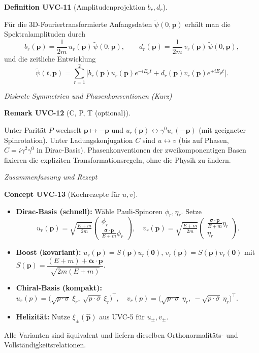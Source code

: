 \documentclass[10pt, letterpaper]{article}
\newcommand{\CustomHeading}[3]{%
  \par\medskip\noindent%
  \textbf{#1 #2} \textnormal{(#3)}.\enskip%
}
\newenvironment{DEF}[2]{\begin{unitbox}\CustomHeading{Definition}{#1}{#2}}{\end{unitbox}}
\newenvironment{REM}[2]{\begin{unitbox}\CustomHeading{Remark}{#1}{#2}}{\end{unitbox}}
\newenvironment{CONC}[2]{\begin{unitbox}\CustomHeading{Concept}{#1}{#2}}{\end{unitbox}}
\begin{document}
\begin{DEF}{UVC-11}{Amplitudenprojektion $b_r,d_r$}
Für die 3D-Fouriertransformierte Anfangsdaten $\tilde\psi(0,\mathbf p)$ erhält man die Spektralamplituden durch
\[
b_r(\mathbf p)=\frac{1}{2m}\,\bar u_r(\mathbf p)\,\tilde\psi(0,\mathbf p),\qquad
d_r(\mathbf p)=\frac{1}{2m}\,\bar v_r(\mathbf p)\,\tilde\psi(0,\mathbf p),
\]
und die zeitliche Entwicklung
\[
\tilde\psi(t,\mathbf p)=\sum_{r=1}^2\big[b_r(\mathbf p)u_r(\mathbf p)e^{-iE_{\mathbf p}t}
+d_r(\mathbf p)v_r(\mathbf p)e^{+iE_{\mathbf p}t}\big].
\]
\end{DEF}

\emph{Diskrete Symmetrien und Phasenkonventionen (Kurz)}

\begin{REM}{UVC-12}{C, P, T (optional)}
Unter Parität $P$ wechselt $\mathbf p\mapsto -\mathbf p$ und $u_r(\mathbf p)\leftrightarrow \gamma^0 u_s(-\mathbf p)$ (mit geeigneter Spinrotation). Unter Ladungskonjugation $C$ sind $u\leftrightarrow v$ (bis auf Phasen, $C=i\gamma^2\gamma^0$ in Dirac-Basis). Phasenkonventionen der zweikomponentigen Basen fixieren die expliziten Transformationsregeln, ohne die Physik zu ändern.
\end{REM}

\emph{Zusammenfassung und Rezept}

\begin{CONC}{UVC-13}{Kochrezepte für $u,v$}
\begin{itemize}
\item \textbf{Dirac-Basis (schnell):} Wähle Pauli-Spinoren $\phi_r,\eta_r$. Setze
\[
u_r(\mathbf p)=\sqrt{\tfrac{E+m}{2m}}
\begin{pmatrix}\phi_r\\ \tfrac{\boldsymbol\sigma\cdot\mathbf p}{E+m}\phi_r\end{pmatrix},\quad
v_r(\mathbf p)=\sqrt{\tfrac{E+m}{2m}}
\begin{pmatrix}\tfrac{\boldsymbol\sigma\cdot\mathbf p}{E+m}\eta_r\\ \eta_r\end{pmatrix}.
\]
\item \textbf{Boost (kovariant):} $u_r(\mathbf p)=S(\mathbf p)u_r(\mathbf 0)$, $v_r(\mathbf p)=S(\mathbf p)v_r(\mathbf 0)$ mit
\(
S(\mathbf p)=\dfrac{(E+m)+\boldsymbol\alpha\cdot\mathbf p}{\sqrt{2m(E+m)}}.
\)
\item \textbf{Chiral-Basis (kompakt):}
\(
u_r(p)=\big(\sqrt{p\!\cdot\!\sigma}\ \xi_r,\ \sqrt{p\!\cdot\!\bar\sigma}\ \xi_r\big)^{\!\top},
\quad
v_r(p)=\big(\sqrt{p\!\cdot\!\sigma}\ \eta_r,\ -\sqrt{p\!\cdot\!\bar\sigma}\ \eta_r\big)^{\!\top}.
\)
\item \textbf{Helizität:} Nutze $\xi_\pm(\hat{\mathbf p})$ aus \textsc{UVC-5} für $u_\pm,v_\pm$.
\end{itemize}
Alle Varianten sind äquivalent und liefern dieselben Orthonormalitäts- und Vollständigkeitsrelationen.
\end{CONC}
\end{document}
